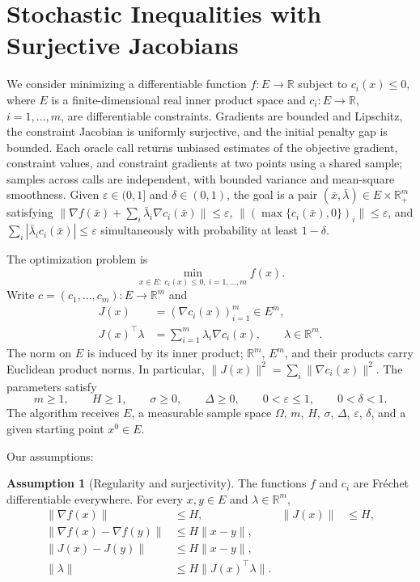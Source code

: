\documentclass[10pt]{article}
\theoremstyle{definition}
\newtheorem{assumption}{Assumption}
\begin{document}
\section*{Stochastic Inequalities with Surjective Jacobians}
We consider minimizing a differentiable function $f:E\to\mathbb{R}$ subject to $c_i(x)\leq0$, where $E$ is a finite-dimensional real inner product space and $c_i:E\to\mathbb{R}$, $i=1,\ldots,m$, are differentiable constraints. Gradients are bounded and Lipschitz, the constraint Jacobian is uniformly surjective, and the initial penalty gap is bounded. Each oracle call returns unbiased estimates of the objective gradient, constraint values, and constraint gradients at two points using a shared sample; samples across calls are independent, with bounded variance and mean-square smoothness. Given $\varepsilon\in(0,1]$ and $\delta\in(0,1)$, the goal is a pair $(\bar{x},\bar{\lambda})\in E\times\mathbb{R}_+^m$ satisfying $\|\nabla f(\bar{x})+\sum_i\bar{\lambda}_i\nabla c_i(\bar{x})\|\leq\varepsilon$, $\|(\max\{c_i(\bar{x}),0\})_i\|\leq\varepsilon$, and $\sum_i|\bar{\lambda}_ic_i(\bar{x})|\leq\varepsilon$ simultaneously with probability at least $1-\delta$.

The optimization problem is
\[
\min_{x\in E:\ c_i(x)\leq0,\ i=1,\ldots,m} f(x).
\]
Write $c=(c_1,\ldots,c_m):E\to\mathbb{R}^m$ and
\[
\begin{aligned}
J(x)&=(\nabla c_i(x))_{i=1}^m\in E^m,\\
J(x)^\top\lambda&=\sum_{i=1}^m\lambda_i\nabla c_i(x),
\qquad \lambda\in\mathbb{R}^m.
\end{aligned}
\]
The norm on $E$ is induced by its inner product; $\mathbb{R}^m$, $E^m$, and their products carry Euclidean product norms. In particular, $\|J(x)\|^2=\sum_i\|\nabla c_i(x)\|^2$.
The parameters satisfy
\[
m\geq1,\qquad H\geq1,\qquad \sigma\geq0,\qquad
\Delta\geq0,\qquad 0<\varepsilon\leq1,\qquad 0<\delta<1.
\]
The algorithm receives $E$, a measurable sample space $\Omega$, $m$, $H$, $\sigma$, $\Delta$, $\varepsilon$, $\delta$, and a given starting point $x^0\in E$.

Our assumptions:
\begin{assumption}[Regularity and surjectivity]
The functions $f$ and $c_i$ are Fr\'echet differentiable everywhere. For every $x,y\in E$ and $\lambda\in\mathbb{R}^m$,
\[
\begin{aligned}
\|\nabla f(x)\|&\leq H,& \|J(x)\|&\leq H,\\
\|\nabla f(x)-\nabla f(y)\|&\leq H\|x-y\|,\\
\|J(x)-J(y)\|&\leq H\|x-y\|,\\
\|\lambda\|&\leq H\|J(x)^\top\lambda\|.
\end{aligned}
\]
\end{assumption}
\end{document}
